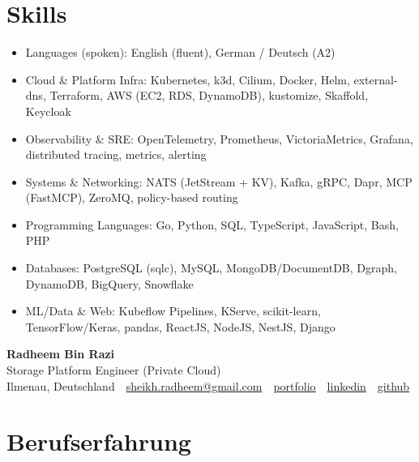 \documentclass[10pt,a4paper]{resume}
\makeatletter
\newcommand{\Portfolio}{https://radheem.github.io/my-cv}
\newcommand{\PortfolioText}{portfolio}
\newcommand{\GitHub}{https://github.com/radheem}
\newcommand{\LinkedIn}{https://www.linkedin.com/in/radheem-razi}
\newcommand{\Email}{sheikh.radheem@gmail.com}
\makeatother
\begin{document}
\section{Skills}

\begin{itemize}[leftmargin=1.4em,nosep,topsep=2pt]
  \item Languages (spoken): English (fluent), German / Deutsch (A2)
  \item Cloud \& Platform Infra: Kubernetes, k3d, Cilium, Docker, Helm, external-dns, Terraform, AWS (EC2, RDS, DynamoDB), kustomize, Skaffold, Keycloak
  \item Observability \& SRE: OpenTelemetry, Prometheus, VictoriaMetrics, Grafana, distributed tracing, metrics, alerting
  \item Systems \& Networking: NATS (JetStream + KV), Kafka, gRPC, Dapr, MCP (FastMCP), ZeroMQ, policy-based routing
  \item Programming Languages: Go, Python, SQL, TypeScript, JavaScript, Bash, PHP
  \item Databases: PostgreSQL (sqlc), MySQL, MongoDB/DocumentDB, Dgraph, DynamoDB, BigQuery, Snowflake
  \item ML/Data \& Web: Kubeflow Pipelines, KServe, scikit-learn, TensorFlow/Keras, pandas, ReactJS, NodeJS, NestJS, Django
\end{itemize}

\clearpage
{}

\begin{center}
  {\huge\bfseries Radheem Bin Razi}\\[3pt]
  {\large Storage Platform Engineer (Private Cloud)}\\[6pt]
  \small
  Ilmenau, Deutschland \,\textbar\,
  \href{mailto:\Email}{\Email} \,\textbar\,
  \href{\Portfolio}{\PortfolioText} \,\textbar\,
  \href{\LinkedIn}{linkedin} \,\textbar\,
  \href{\GitHub}{github}
\end{center}
\vspace{2pt}

\section{Berufserfahrung}
\end{document}
